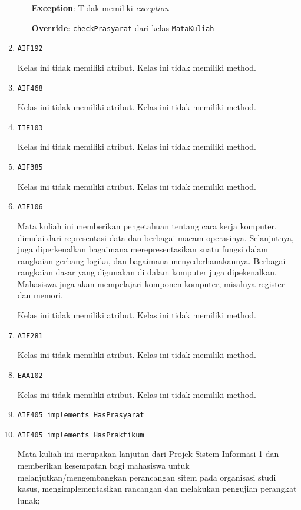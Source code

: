 \documentclass{article}
\begin{document}
\begin{enumerate}
\begin{itemize}
\textbf{Exception}: Tidak memiliki \textit{exception}

\textbf{Override}: \texttt{checkPrasyarat} dari kelas \texttt{MataKuliah}

\end{itemize}
\item \texttt{AIF192}



Kelas ini tidak memiliki atribut. Kelas ini tidak memiliki method. \item \texttt{AIF468}



Kelas ini tidak memiliki atribut. Kelas ini tidak memiliki method. \item \texttt{IIE103}



Kelas ini tidak memiliki atribut. Kelas ini tidak memiliki method. \item \texttt{AIF385}



Kelas ini tidak memiliki atribut. Kelas ini tidak memiliki method. \item \texttt{AIF106}

Mata kuliah ini memberikan pengetahuan tentang cara kerja komputer, dimulai 
 dari representasi data dan berbagai macam operasinya. Selanjutnya, juga 
 diperkenalkan bagaimana merepresentasikan suatu fungsi dalam rangkaian 
 gerbang logika, dan bagaimana menyederhanakannya. Berbagai rangkaian dasar 
 yang digunakan di dalam komputer juga dipekenalkan. Mahasiswa juga akan 
 mempelajari komponen komputer, misalnya register dan memori.

Kelas ini tidak memiliki atribut. Kelas ini tidak memiliki method. \item \texttt{AIF281}



Kelas ini tidak memiliki atribut. Kelas ini tidak memiliki method. \item \texttt{EAA102}



Kelas ini tidak memiliki atribut. Kelas ini tidak memiliki method. \item \texttt{AIF405 implements HasPrasyarat}

\item \texttt{AIF405 implements HasPraktikum}

Mata kuliah ini merupakan lanjutan dari Projek Sistem Informasi 1 dan
 memberikan kesempatan bagi mahasiswa untuk melanjutkan/mengembangkan
 perancangan sitem pada organisasi studi kasus, mengimplementasikan rancangan
 dan melakukan pengujian perangkat lunak;


\end{enumerate}
\end{document}
